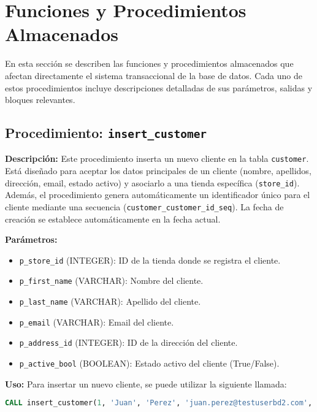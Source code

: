 \documentclass{article}
\begin{document}
\section{Funciones y Procedimientos Almacenados}

En esta sección se describen las funciones y procedimientos almacenados que afectan directamente el sistema transaccional de la base de datos. Cada uno de estos procedimientos incluye descripciones detalladas de sus parámetros, salidas y bloques relevantes.

\subsection{Procedimiento: \texttt{insert\_customer}}

\textbf{Descripción:}  
Este procedimiento inserta un nuevo cliente en la tabla \texttt{customer}. Está diseñado para aceptar los datos principales de un cliente (nombre, apellidos, dirección, email, estado activo) y asociarlo a una tienda específica (\texttt{store\_id}). Además, el procedimiento genera automáticamente un identificador único para el cliente mediante una secuencia (\texttt{customer\_customer\_id\_seq}). La fecha de creación se establece automáticamente en la fecha actual.

\textbf{Parámetros:}
\begin{itemize}
    \item \texttt{p\_store\_id} (INTEGER): ID de la tienda donde se registra el cliente.
    \item \texttt{p\_first\_name} (VARCHAR): Nombre del cliente.
    \item \texttt{p\_last\_name} (VARCHAR): Apellido del cliente.
    \item \texttt{p\_email} (VARCHAR): Email del cliente.
    \item \texttt{p\_address\_id} (INTEGER): ID de la dirección del cliente.
    \item \texttt{p\_active\_bool} (BOOLEAN): Estado activo del cliente (True/False).
\end{itemize}

\textbf{Uso:}
Para insertar un nuevo cliente, se puede utilizar la siguiente llamada:

\begin{lstlisting}[language=SQL]
CALL insert_customer(1, 'Juan', 'Perez', 'juan.perez@testuserbd2.com', 101, TRUE);
\end{lstlisting}
\end{document}

